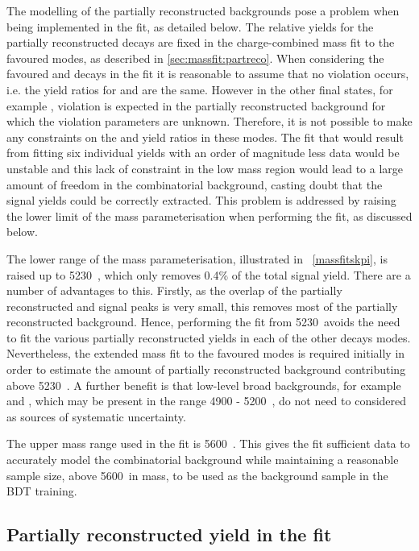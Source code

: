 The modelling of the partially reconstructed backgrounds pose a problem when being implemented in the \CP fit, as detailed below. The relative yields for the partially reconstructed decays are fixed in the charge-combined mass fit to the favoured modes, as described in \sect\ref{sec:massfit:partreco}. When considering the favoured \kpi and \kpipipi decays in the \CP fit it is reasonable to assume that no \CP violation occurs, i.e. the yield ratios for \Bm and \Bp are the same. However in the other \Dz final states, for example \pik, \CP violation is expected in the partially reconstructed background for which the \CP violation parameters are unknown. Therefore, it is not possible to make any constraints on the \Bp and \Bm yield ratios in these modes. The fit that would result from fitting six individual yields with an order of magnitude less data would be unstable and this lack of constraint in the low mass region would lead to a large amount of freedom in the combinatorial background, casting doubt that the signal yields could be correctly extracted. This problem is addressed by raising the lower limit of the \Bm mass parameterisation when performing the \CP fit, as discussed below.

The lower range of the mass parameterisation, illustrated in \fig~\ref{massfitskpi}, is raised up to 5230~\mevcc, which only removes 0.4\% of the total signal yield. There are a number of advantages to this. Firstly, as the overlap of the partially reconstructed and signal peaks is very small, this removes most of the partially reconstructed background. Hence, performing the \CP fit from 5230~\mevcc avoids the need to fit the various partially reconstructed yields in each of the other \Dz decays modes. Nevertheless, the extended mass fit to the favoured modes is required initially in order to estimate the amount of partially reconstructed background contributing above 5230~\mevcc. A further benefit is that low-level broad backgrounds, for example \decay{\Bm}{\D\Kstarm\piz} and \decay{\Bd}{\Kp\pim\pip\pim}, which may be present in the range 4900 - 5200~\mevcc, do not need to considered as sources of systematic uncertainty. 

The upper mass range used in the \CP fit is 5600~\mevcc. This gives the fit sufficient data to accurately model the combinatorial background while maintaining a reasonable sample size, above 5600~\mevcc in \Bm mass, to be used as the background sample in the BDT training.

\subsection{Partially reconstructed yield in the \CP fit}
\label{sec:cpfit:partrecoyields}

